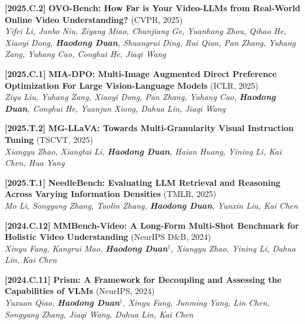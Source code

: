 \documentclass{resume}
\newcommand{\itemgap}{\vspace{-1mm}}%
\begin{document}
\itemgap

\textbf{[2025.C.2]} \textbf{OVO-Bench: How Far is Your Video-LLMs from Real-World Online Video Understanding?} (CVPR, 2025) \\
\textit{Yifei Li, Junbo Niu, Ziyang Miao, Chunjiang Ge, Yuanhang Zhou, Qihao He, Xiaoyi Dong, \textbf{Haodong Duan}, Shuangrui Ding, Rui Qian, Pan Zhang, Yuhang Zang, Yuhang Cao, Conghui He, Jiaqi Wang} \\

\itemgap

\textbf{[2025.C.1]} \textbf{MIA-DPO: Multi-Image Augmented Direct Preference Optimization For Large Vision-Language Models} (ICLR, 2025) \\
\textit{Ziyu Liu, Yuhang Zang, Xiaoyi Dong, Pan Zhang, Yuhang Cao, \textbf{Haodong Duan}, Conghui He, Yuanjun Xiong, Dahua Lin, Jiaqi Wang} \\ 

\itemgap

\textbf{[2025.T.2]} \textbf{MG-LLaVA: Towards Multi-Granularity Visual Instruction Tuning}  (TSCVT, 2025) \\
\textit{Xiangyu Zhao, Xiangtai Li, \textbf{Haodong Duan}, Haian Huang, Yining Li, Kai Chen, Hua Yang} \\

\itemgap

\textbf{[2025.T.1]} \textbf{NeedleBench: Evaluating LLM Retrieval and Reasoning Across Varying Information Densities} (TMLR, 2025) \\
\textit{Mo Li, Songyang Zhang, Taolin Zhang, \textbf{Haodong Duan}, Yunxin Liu, Kai Chen} \\ 

\itemgap

\textbf{[2024.C.12]} \textbf{MMBench-Video: A Long-Form Multi-Shot Benchmark for Holistic Video Understanding}  (NeurIPS D\&B, 2024) \\
\textit{Xinyu Fang, Kangrui Mao, \textbf{Haodong Duan$^\dag$}, Xiangyu Zhao, Yining Li, Dahua Lin, Kai Chen} \\

\itemgap

\textbf{[2024.C.11]} \textbf{Prism: A Framework for Decoupling and Assessing the Capabilities of VLMs} (NeurIPS, 2024) \\
\textit{Yuxuan Qiao, \textbf{Haodong Duan$^\dag$}, Xinyu Fang, Junming Yang, Lin Chen, Songyang Zhang, Jiaqi Wang, Dahua Lin, Kai Chen} \\ 

\itemgap
\end{document}
